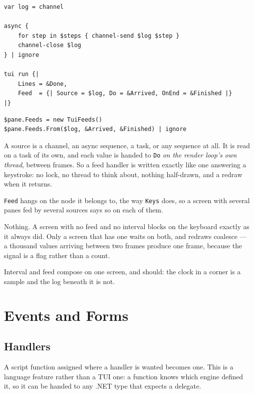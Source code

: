 \documentclass[11pt,a4paper,twoside,openany]{book}
\newcommand{\code}[1]{\texttt{\small #1}}
\begin{document}
\begin{lstlisting}
var log = channel

async {
    for step in $steps { channel-send $log $step }
    channel-close $log
} | ignore

tui run {|
    Lines = &Done,
    Feed  = {| Source = $log, Do = &Arrived, OnEnd = &Finished |}
|}
\end{lstlisting}

\begin{lstlisting}
$pane.Feeds = new TuiFeeds()
$pane.Feeds.From($log, &Arrived, &Finished) | ignore
\end{lstlisting}

A source is a channel, an async sequence, a task, or any sequence at all. It is
read on a task of its own, and each value is handed to \code{Do} \emph{on the render
loop's own thread}, between frames. So a feed handler is written exactly like one
answering a keystroke: no lock, no thread to think about, nothing half-drawn, and
a redraw when it returns.

\code{Feed} hangs on the node it belongs to, the way \code{Keys} does, so a screen
with several panes fed by several sources says so on each of them.

\begin{aside}
Nothing. A screen with no feed and no interval blocks on the keyboard exactly as it
always did. Only a screen that has one waits on both, and redraws coalesce --- a
thousand values arriving between two frames produce one frame, because the signal
is a flag rather than a count.
\end{aside}

Interval and feed compose on one screen, and should: the clock in a corner is a
sample and the log beneath it is not.

\chapter{Events and Forms}
\label{ch:events}

\section{Handlers}

A script function assigned where a handler is wanted becomes one. This is a
language feature rather than a TUI one: a function knows which engine defined it,
so it can be handed to any .NET type that expects a delegate.
\end{document}
